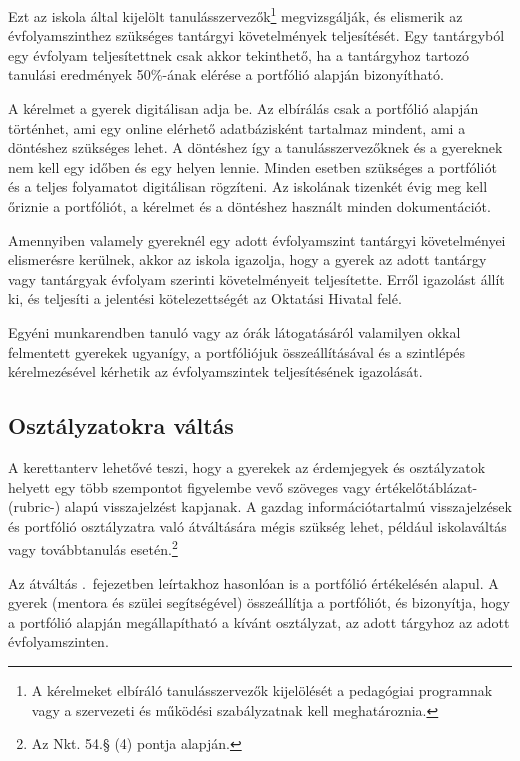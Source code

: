 Ezt az iskola által kijelölt tanulásszervezők\footnote{A kérelmeket
  elbíráló tanulásszervezők kijelölését a pedagógiai programnak vagy a
  szervezeti és működési szabályzatnak kell meghatároznia.}
megvizsgálják, és elismerik az évfolyamszinthez szükséges tantárgyi
követelmények teljesítését.\linebreak
Egy tantárgyból egy évfolyam teljesítettnek csak akkor tekinthető, ha
a tantárgyhoz tartozó tanulási eredmények 50\%-ának elérése a
portfólió\linebreak
alapján bizonyítható.

A kérelmet a gyerek digitálisan adja be. Az elbírálás csak a portfólió alapján történhet, ami egy online elérhető adatbázisként tartalmaz mindent, ami a döntéshez szükséges lehet. A döntéshez így a tanulásszervezőknek és a gyereknek nem kell egy időben és egy helyen lennie. Minden esetben szükséges a portfóliót és a teljes folyamatot digitálisan rögzíteni. Az iskolának tizenkét évig meg kell őriznie a portfóliót, a kérelmet és a döntéshez használt minden dokumentációt.

Amennyiben valamely gyereknél egy adott évfolyamszint
tantárgyi\linebreak
követelményei elismerésre kerülnek, akkor az iskola igazolja, hogy a gyerek az adott tantárgy vagy tantárgyak évfolyam szerinti követelményeit teljesítette. Erről igazolást állít ki, és teljesíti a jelentési kötelezettségét az Oktatási Hivatal felé.

Egyéni munkarendben tanuló vagy az órák látogatásáról valamilyen okkal felmentett gyerekek ugyanígy, a portfóliójuk összeállításával és a szintlépés kérelmezésével kérhetik az évfolyamszintek teljesítésének igazolását.

\subsection{Osztályzatokra váltás}
\label{sec:osztalyzatok}
A kerettanterv lehetővé teszi, hogy a gyerekek az érdemjegyek és osztályzatok helyett egy több szempontot figyelembe vevő szöveges vagy ér\-té\-ke\-lő\-táb\-lá\-zat- (rubric-) alapú visszajelzést kapjanak. A gazdag információtartalmú visszajelzések és portfólió osztályzatra való átváltására mégis szükség lehet, például iskolaváltás vagy továbbtanulás esetén.\footnote{Az Nkt. 54.§ (4) pontja alapján.}

Az átváltás .~fejezetben leírtakhoz hasonlóan is a portfólió értékelésén alapul. A gyerek (mentora és szülei segítségével) összeállítja a portfóliót, és bizonyítja, hogy a portfólió alapján megállapítható a kívánt osztályzat, az adott tárgyhoz az adott évfolyamszinten.
